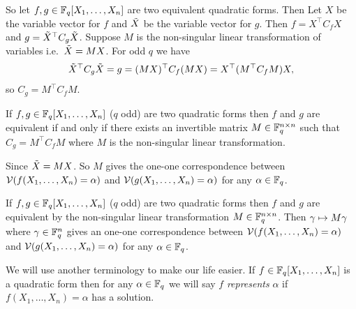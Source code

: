 So let $f,g\in\mathbb{F}_q[X_1,\dots, X_n]$ are two equivalent quadratic forms. Then Let $X$ be the variable vector for $f$ and $\tilde{X}$ be the variable vector for $g$. Then $f=X^\top C_fX$ and $g=\tilde{X}^\top C_g\tilde{X}$. Suppose $M$ is the non-singular linear transformation of variables i.e.\ $\tilde{X}=MX$. For odd $q$ we have $$\tilde{X}^\top C_g\tilde{X}=g=(MX)^\top C_f(MX)= X^\top (M^\top C_f M)X,$$so $C_g=M^\top C_fM$.
\begin{observation}\label{obs:coeff-matrix-equivalent}
  If $f,g\in\mathbb{F}_q[X_1,\dots, X_n]$ ($q$ odd) are two quadratic forms then $f$ and $g$ are equivalent if and only if there exists an invertible matrix $M\in\mathbb{F}_q^{n\times n}$ such that $C_g=M^\top C_fM$ where $M$ is the non-singular linear transformation. 
\end{observation}
Since $\tilde{X}=MX$. So $M$ gives the one-one correspondence between $\mathcal{V}(f(X_1,\dots,X_n)=\alpha)$ and $\mathcal{V}(g(X_1,\dots,X_n)=\alpha)$ for any $\alpha\in\mathbb{F}_q$. 
\begin{observation}\label{obs:solution-correspondence-equivalent}
  If $f,g\in\mathbb{F}_q[X_1,\dots, X_n]$ ($q$ odd) are two quadratic forms then $f$ and $g$ are equivalent by the non-singular linear transformation $M\in\mathbb{F}_q^{n\times n}$. Then $\gamma\mapsto M\gamma$ where $\gamma\in\mathbb{F}_q^n$ gives an one-one correspondence between $\mathcal{V}(f(X_1,\dots,X_n)=\alpha)$ and $\mathcal{V}(g(X_1,\dots,X_n)=\alpha)$ for any $\alpha\in\mathbb{F}_q$. 
\end{observation}
We will use another terminology to make our life easier. If $f\in\mathbb{F}_q[X_1,\dots, X_n]$ is a quadratic form then for any $\alpha\in\mathbb{F}_q$ we will say $f$ \emph{represents} $\alpha$ if $f(X_1,\dots, X_n)=\alpha$ has a solution.

